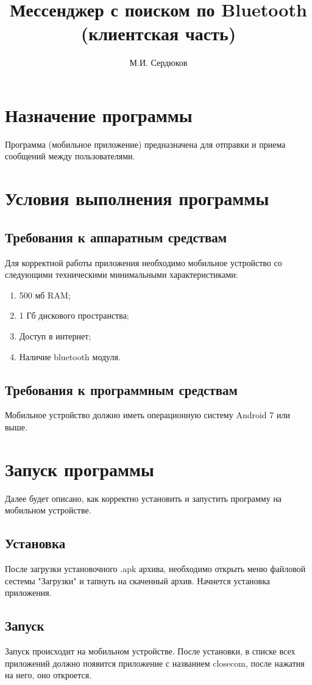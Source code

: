 \documentclass[opermanual]{espd}
\author{М.И. Сердюков}
\title{Мессенджер с поиском по Bluetooth\\(клиентская часть)}
\begin{document}
\tableofcontents

\section{Назначение программы}
Программа (мобильное приложение) предназначена для отправки и приема сообщений между пользователями. 

\section{Условия выполнения программы}
\subsection{Требования к аппаратным средствам}
Для корректной работы приложения необходимо мобильное устройство со следующими техническими минимальными характеристиками:
\begin{enumerate}
\item 500 мб RAM;
\item 1 Гб дискового пространства;
\item Доступ в интернет;
\item Наличие bluetooth модуля.
\end{enumerate}

\subsection{Требования к программным средствам}
Мобильное устройство должно иметь операционную систему Android 7 или выше. 

\section{Запуск программы}
Далее будет описано, как корректно установить и запустить программу на мобильном устройстве.

\subsection{Установка}
После загрузки установочного .apk архива, необходимо открыть меню файловой сестемы "Загрузки" и тапнуть на скаченный архив. Начнется установка приложения.

\subsection{Запуск}
Запуск происходит на мобильном устройстве. После установки, в списке всех приложений должно появится приложение с названием closecom, после нажатия на него, оно откроется.
\end{document}
